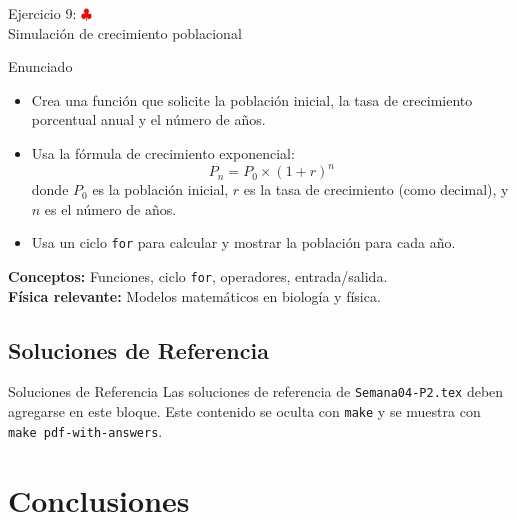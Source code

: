 \documentclass[10pt]{beamer}
\begin{document}
\begin{frame}{Ejercicio 9: \hfill \textcolor{red}{$\clubsuit$} \\ Simulación de crecimiento poblacional}
  \begin{block}{Enunciado}
    \begin{itemize}
      \item Crea una función que solicite la población inicial, la tasa de crecimiento porcentual anual y el número de años.
      \item Usa la fórmula de crecimiento exponencial:
        \[
        P_{n} = P_0 \times (1 + r)^n
        \]
        donde \(P_0\) es la población inicial, \(r\) es la tasa de crecimiento (como decimal), y \(n\) es el número de años.
      \item Usa un ciclo \texttt{for} para calcular y mostrar la población para cada año.
    \end{itemize}
  \end{block}
  \textbf{Conceptos:} Funciones, ciclo \texttt{for}, operadores, entrada/salida.\\
  \textbf{Física relevante:} Modelos matemáticos en biología y física.
\end{frame}

\begin{solutionblock}
\section{Soluciones de Referencia}

\begin{frame}{Soluciones de Referencia}
  \small
  Las soluciones de referencia de \texttt{Semana04-P2.tex} deben agregarse en
  este bloque. Este contenido se oculta con \texttt{make} y se muestra con
  \texttt{make pdf-with-answers}.
\end{frame}
\end{solutionblock}


\section{Conclusiones}
\end{document}
